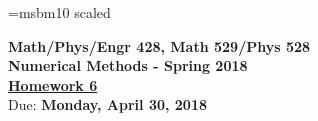 \documentclass [12pt]{article}
\begin{document}
\def\e{\mathop{\rm e}\nolimits}
\def\abs{\mathop{\rm abs}\nolimits}
\def\sign{\mathop{\rm sign}\nolimits}
\font\bb=msbm10 scaled  %
\def\R{\hbox{\bb R}}

\noindent
\begin{center}
{ \bf  {Math/Phys/Engr 428, Math 529/Phys 528 \\
Numerical Methods - Spring 2018 }}\\[7pt]
\underline{\bf Homework 6}\\

Due: {\bf Monday, April 30, 2018}

\end{center}
\end{document}
